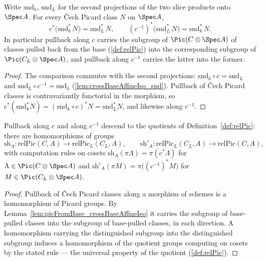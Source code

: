 \begin{lemma}
  \label{lem:picFromBase_crossBaseAffineIso}
  \leanok
  Write \(\mathrm{snd}_k\), \(\mathrm{snd}_L\) for the second projections of the two
  slice products onto \(\Spec A\). For every \v Cech Picard class \(N\) on \(\Spec A\),
  \[
    c^{*}\bigl(\mathrm{snd}_k^{*}\, N\bigr) = \mathrm{snd}_L^{*}\, N,
    \qquad
    (c^{-1})^{*}\bigl(\mathrm{snd}_L^{*}\, N\bigr) = \mathrm{snd}_k^{*}\, N .
  \]
  In particular pullback along \(c\) carries the subgroup of
  \(\Pic(C \otimes \Spec A)\) of classes pulled back from the base (\ref{def:relPic})
  into the corresponding subgroup of \(\Pic(C_L \otimes \Spec A)\), and pullback along
  \(c^{-1}\) carries the latter into the former.
\end{lemma}
\begin{proof}
  \leanok
  The comparison commutes with the second projections:
  \(\mathrm{snd}_k \circ c = \mathrm{snd}_L\) and
  \(\mathrm{snd}_L \circ c^{-1} = \mathrm{snd}_k\)
  (\ref{lem:crossBaseAffineIso_snd}). Pullback of \v Cech Picard classes is
  contravariantly functorial in the morphism, so
  \(c^{*}(\mathrm{snd}_k^{*} N) = (\mathrm{snd}_k \circ c)^{*} N =
  \mathrm{snd}_L^{*} N\), and likewise along \(c^{-1}\).
\end{proof}

\begin{definition}
  \label{def:relPicCrossBase}
  \leanok
  Pullback along \(c\) and along \(c^{-1}\) descend to the quotients of
  Definition~\ref{def:relPic}: there are homomorphisms of groups
  \[
    \mathrm{sh}_A : \mathrm{relPic}(C,A) \longrightarrow \mathrm{relPic}_L(C_L, A),
    \qquad
    \mathrm{sh}'_A : \mathrm{relPic}_L(C_L, A) \longrightarrow \mathrm{relPic}(C,A),
  \]
  with computation rules on cosets
  \(\mathrm{sh}_A(\pi \Lambda) = \pi(c^{*} \Lambda)\) for
  \(\Lambda \in \Pic(C \otimes \Spec A)\) and
  \(\mathrm{sh}'_A(\pi M) = \pi\bigl((c^{-1})^{*} M\bigr)\) for
  \(M \in \Pic(C_L \otimes \Spec A)\).
\end{definition}
\begin{proof}
  \leanok
  Pullback of \v Cech Picard classes along a morphism of schemes is a homomorphism of
  Picard groups. By Lemma~\ref{lem:picFromBase_crossBaseAffineIso} it carries the
  subgroup of base-pulled classes into the subgroup of base-pulled classes, in each
  direction. A homomorphism carrying the distinguished subgroup into the distinguished
  subgroup induces a homomorphism of the quotient groups computing on cosets by the
  stated rule --- the universal property of the quotient (\ref{def:relPic}).
\end{proof}

